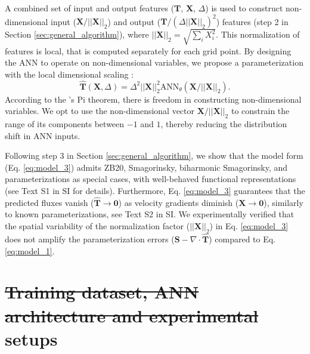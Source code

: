 \documentclass[draft]{agujournal2019}
\providecommand{\DIFadd}[1]{{\protect\color{blue}\uwave{#1}}} %
\providecommand{\DIFdel}[1]{{\protect\color{red}\sout{#1}}}                      %
\providecommand{\DIFaddbegin}{} %
\providecommand{\DIFaddend}{} %
\providecommand{\DIFdelbegin}{} %
\providecommand{\DIFdelend}{} %
\begin{document}
A combined set of input and output features ($\mathbf{T}$, $\mathbf{X}$, $\Delta$) is used to construct non-dimensional input ($\mathbf{X} / ||\mathbf{X}||_2$) and output ($\mathbf{T} / (\Delta ||\mathbf{X}||_2)^2$) features (step 2 in Section \ref{sec:general_algorithm}), where $||\mathbf{X}||_2= \sqrt{\sum_i X_i^2}$. This normalization of features is local, that is computed separately for each grid point. By designing the ANN to operate on non-dimensional variables, we propose a parameterization with the local dimensional scaling \cite{reissmann2021application, prakash2022invariant}:
\begin{equation}
    \widehat{\mathbf{T}}(\mathbf{X}, \Delta) = \Delta^2 ||\mathbf{X}||_2^2 \mathrm{ANN}_{\theta} (\mathbf{X} / ||\mathbf{X}||_2). \label{eq:model_3}
\end{equation}
According to the 's Pi theorem, there is freedom in constructing non-dimensional variables. We opt to use the non-dimensional vector $\mathbf{X} / ||\mathbf{X}||_2$ to constrain the range of its components between $-1$ and $1$, thereby reducing the distribution shift in ANN inputs. 

Following step 3 in Section \ref{sec:general_algorithm}, we show that the model form (Eq. \eqref{eq:model_3}) admits ZB20, Smagorinsky, biharmonic Smagorinsky, and  parameterizations as special cases, with well-behaved functional representations (see Text S1 in SI for details). Furthermore, Eq. \eqref{eq:model_3} guarantees that the predicted fluxes vanish ($\widehat{\mathbf{T}}\to\mathbf{0}$) as velocity gradients diminish ($\mathbf{X}\to\mathbf{0}$), similarly to known parameterizations, see Text S2 in SI. We experimentally verified that the spatial variability of the normalization factor ($||\mathbf{X}||_2$) in Eq. \eqref{eq:model_3} does not amplify the parameterization errors ($\mathbf{S}-\nabla \cdot \widehat{\mathbf{T}}$) compared to Eq. \eqref{eq:model_1}.



\section{\DIFdelbegin \DIFdel{Training dataset, ANN architecture and experimental }\DIFdelend \DIFaddbegin \DIFadd{Experimental }\DIFaddend setups}
\end{document}
